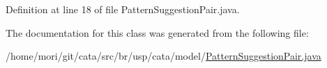 Definition at line 18 of file Pattern\+Suggestion\+Pair.\+java.



The documentation for this class was generated from the following file\+:\begin{DoxyCompactItemize}
\item 
/home/mori/git/cata/src/br/usp/cata/model/\hyperlink{_pattern_suggestion_pair_8java}{Pattern\+Suggestion\+Pair.\+java}\end{DoxyCompactItemize}
